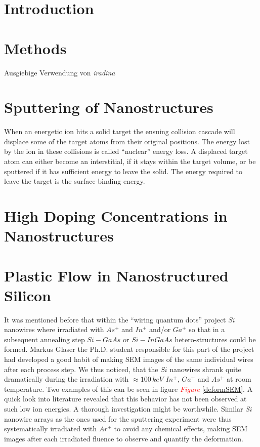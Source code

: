 \documentclass[12pt,
paper=a4,				
DIV=calc,		  %
BCOR=16mm,	  %
headinclude,
openany
]{scrbook}
\newcommand{\TODO}[1]{{\LARGE{\textcolor{red}{\emph {#1 }}}}}
\begin{document}


\tableofcontents

\chapter{Introduction}
\setcounter{page}{1}




\chapter{Methods}


Ausgiebige Verwendung von \emph{iradina} \cite{borschel_ion_2011}

\chapter{Sputtering of Nanostructures}


When an energetic ion hits a solid target the ensuing collision cascade will displace some of the target atoms from their original positions. The energy lost by the ion in these collisions is called ``nuclear'' energy loss. A displaced target atom can either become an interstitial, if it stays within the target volume, or be sputtered if it has sufficient energy to leave the solid. The energy required to leave the target is the surface-binding-energy.

\chapter{High Doping Concentrations in Nanostructures}


\chapter{Plastic Flow in Nanostructured Silicon}

It was mentioned before that within the ``wiring quantum dots'' project $Si$ nanowires where irradiated with $As^+$ and $In^+$ and/or $Ga^+$ so that in a subsequent annealing step $Si-GaAs$ or $Si-InGaAs$ hetero-structures could be formed. Markus Glaser the Ph.D. student responsible for this part of the project had developed a good habit of making SEM images of the same individual wires after each process step. We thus noticed, that the $Si$ nanowires shrank quite dramatically during the irradiation with $\approx 100\,keV$ $In^+$, $Ga^+$ and $As^+$ at room temperature. Two examples of this can be seen in figure \TODO{Figure}\ref{deformSEM}. A quick look into literature revealed that this behavior has not been observed at such low ion energies. A thorough investigation might be worthwhile. Similar $Si$ nanowire arrays as the ones used for the sputtering experiment were thus systematically irradiated with $Ar^+$ to avoid any chemical effects, making SEM images after each irradiated fluence to observe and quantify the deformation.
\end{document}

